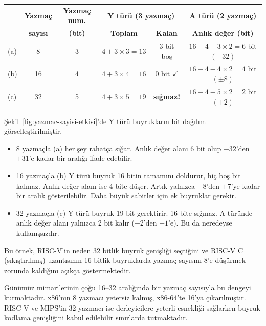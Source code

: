 \begin{ornek}[3.5]
\begin{table}[H]
\centering
\small
\begin{tabular}{lccccc}
\toprule
 & \textbf{Yazmaç} & \textbf{Yazmaç num.} & \multicolumn{2}{c}{\textbf{Y türü (3 yazmaç)}} & \textbf{A türü (2 yazmaç)} \\
 & \textbf{sayısı} & \textbf{(bit)} & \textbf{Toplam} & \textbf{Kalan} & \textbf{Anlık değer (bit)} \\
\midrule
(a) & 8  & 3 & $4 + 3\!\times\!3 = 13$ & 3 bit boş & $16 - 4 - 3\!\times\!2 = 6$ bit $(\pm 32)$ \\
(b) & 16 & 4 & $4 + 3\!\times\!4 = 16$ & 0 bit $\checkmark$ & $16 - 4 - 4\!\times\!2 = 4$ bit $(\pm 8)$ \\
(c) & 32 & 5 & $4 + 3\!\times\!5 = 19$ & \textbf{sığmaz!} & $16 - 4 - 5\!\times\!2 = 2$ bit $(\pm 2)$ \\
\bottomrule
\end{tabular}
\end{table}

Şekil~\ref{fig:yazmac-sayisi-etkisi}'de Y türü buyrukların bit dağılımı görselleştirilmiştir.
\begin{itemize}[nosep]
\item 8 yazmaçla (a) her şey rahatça sığar. Anlık değer alanı 6 bit olup $-32$'den $+31$'e kadar bir aralığı ifade edebilir.
\item 16 yazmaçla (b) Y türü buyruk 16 bitin tamamını doldurur, hiç boş bit kalmaz. Anlık değer alanı ise 4 bite düşer. Artık yalnızca $-8$'den $+7$'ye kadar bir aralık gösterilebilir. Daha büyük sabitler için ek buyruklar gerekir.
\item 32 yazmaçla (c) Y türü buyruk 19 bit gerektirir. 16 bite sığmaz. A türünde anlık değer alanı yalnızca 2 bit kalır ($-2$'den $+1$'e). Bu da neredeyse kullanışsızdır.
\end{itemize}

Bu örnek, RISC-V'in neden 32 bitlik buyruk genişliği seçtiğini ve RISC-V C (sıkıştırılmış) uzantısının 16 bitlik buyruklarda yazmaç sayısını 8'e düşürmek zorunda kaldığını açıkça göstermektedir.
\end{ornek}

Günümüz mimarilerinin çoğu 16--32 aralığında bir yazmaç sayısıyla bu dengeyi kurmaktadır. x86'nın 8 yazmacı yetersiz kalmış, x86-64'te 16'ya çıkarılmıştır. RISC-V ve MIPS'in 32 yazmacı ise derleyicilere yeterli esnekliği sağlarken buyruk kodlama genişliğini kabul edilebilir sınırlarda tutmaktadır.

